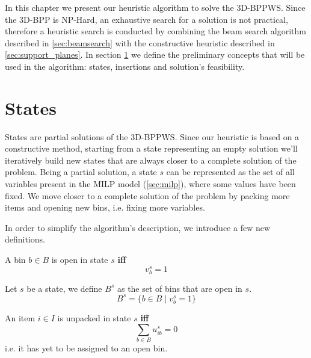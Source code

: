 In this chapter we present our heuristic algorithm to solve the 3D-BPPWS. 
Since the 3D-BPP is NP-Hard, an exhaustive search for a solution is not practical, therefore a heuristic search is conducted by combining the beam search algorithm described in \cref{sec:beamsearch} with the constructive heuristic described in \cref{sec:support_planes}.
In section \ref{sec:problem_state} we define the preliminary concepts that will be used in the algorithm: states, insertions and solution's feasibility.

\section{States}
\label{sec:problem_state}%
States are partial solutions of the 3D-BPPWS. Since our heuristic is based on a constructive method, starting from a state representing an empty solution we'll iteratively build new states that are always closer to a complete solution of the problem.
Being a partial solution, a state $s$ can be represented as the set of all variables present in the MILP model (\ref{sec:milp}), where some values have been fixed. We move closer to a complete solution of the problem by packing more items and opening new bins, i.e. fixing more variables.

In order to simplify the algorithm's description, we introduce a few new definitions.

\begin{definition}
    A bin $b \in B$ is open in state $s$ \textbf{iff}
    \begin{equation*}
        v^{s}_{b} = 1
    \end{equation*}
\end{definition}

\begin{definition}
    Let $s$ be a state, we define $B^s$ as the set of bins that are open in $s$.
    \begin{equation*}
        B^s = \{ b \in B \mid v^{s}_{b} = 1 \}
    \end{equation*}
\end{definition}

\begin{definition}
    An item $i \in I$ is unpacked in state $s$ \textbf{iff}
    \begin{equation*}
        \sum_{b \in B} u^{s}_{ib} = 0
    \end{equation*}
    i.e. it has yet to be assigned to an open bin.
\end{definition}

